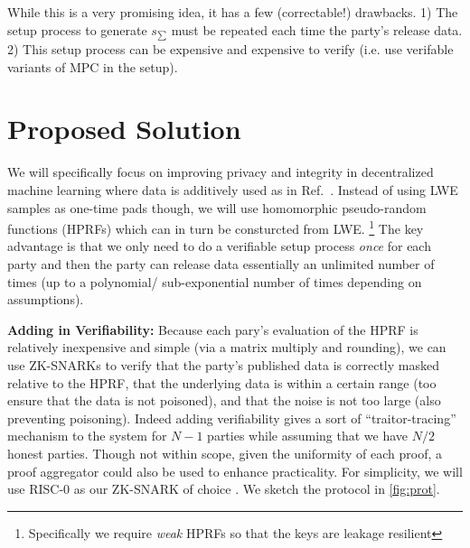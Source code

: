 \documentclass[11pt]{article}
\begin{document}
While this is a very promising idea, it has a few (correctable!) drawbacks.
1) The setup process to generate $s_{\sum}$ must be repeated each time the party's release data.
2) This setup process can be expensive and expensive to verify (i.e. use verifable variants of MPC in the setup).


\section{Proposed Solution}
We will specifically focus on improving privacy and integrity in decentralized machine learning where data is additively used as in Ref.~\cite{stevens2021efficientdifferentiallyprivatesecure}.
Instead of using LWE samples as one-time pads though, we will use homomorphic pseudo-random functions (HPRFs)  which can in turn be consturcted from LWE.
\footnote{Specifically we require \emph{weak} HPRFs so that the keys are leakage resilient}
The key advantage is that we only need to do a verifiable setup process \emph{once} for each party and then the party can release data essentially an unlimited number of times (up to a polynomial/ sub-exponential number of times depending on assumptions).

\textbf{Adding in Verifiability:} Because each pary's evaluation of the HPRF is relatively inexpensive and simple (via a matrix multiply and rounding), we can use ZK-SNARKs to verify that the party's published data is correctly masked relative to the HPRF, that the underlying data is within a certain range (too ensure that the data is not poisoned), and that the noise is not too large (also preventing poisoning).
Indeed adding verifiability gives a sort of ``traitor-tracing'' mechanism to the system for $N - 1$ parties while assuming that we have $N /2$ honest parties.
Though not within scope, given the uniformity of each proof, a proof aggregator could also be used to enhance practicality.
For simplicity, we will use RISC-0 as our ZK-SNARK of choice .
We sketch the protocol in \cref{fig:prot}.
\end{document}
